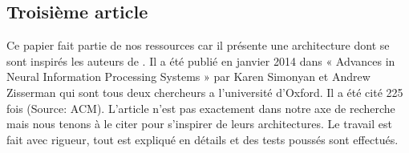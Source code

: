 \documentclass[12pt]{article}
\begin{document}
\subsection{Troisième article \cite{Simonyan2014}} 
\newline
Ce papier fait partie de nos ressources car il présente une architecture dont se sont inspirés les auteurs de \cite{Wang2016}. Il a été publié en janvier 2014 dans  « Advances in Neural Information Processing Systems » par Karen Simonyan et Andrew Zisserman qui sont tous deux chercheurs a l’université d’Oxford. Il a été cité 225 fois (Source: ACM). L’article n’est pas exactement dans notre axe de recherche mais nous tenons à le citer pour s’inspirer de leurs architectures. Le travail est fait avec rigueur, tout est expliqué en détails et des tests poussés sont effectués. 
\end{document}
